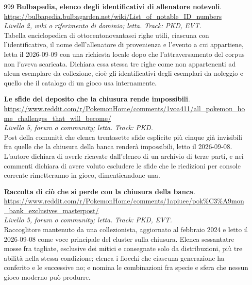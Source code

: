\begin{thebibliography}{999}
  \textbf{Bulbapedia, elenco degli identificativi di allenatore notevoli}.
  \\ \url{https://bulbapedia.bulbagarden.net/wiki/List_of_notable_ID_numbers}
  \\ \emph{Livello 2, wiki o riferimento di dominio; letta. Track: PKD, EVT.}
  \\ Tabella enciclopedica di ottocentonovantasei righe utili, ciascuna con l'identificativo, il nome dell'allenatore di provenienza e l'evento a cui appartiene, letta il 2026-09-09 con una richiesta locale dopo che l'attraversamento del corpus non l'aveva scaricata. Dichiara essa stessa tre righe come non appartenenti ad alcun esemplare da collezione, cioè gli identificativi degli esemplari da noleggio e quello che il catalogo di un gioco usa internamente.

  \textbf{Le sfide del deposito che la chiusura rende impossibili}.
  \\ \url{https://www.reddit.com/r/PokemonHome/comments/1voa411/all_pokemon_home_challenges_that_will_become/}
  \\ \emph{Livello 5, forum o community; letta. Track: PKD.}
  \\ Post della comunità che elenca trentasette sfide esplicite più cinque già invisibili fra quelle che la chiusura della banca renderà impossibili, letto il 2026-09-08. L'autore dichiara di averle ricavate dall'elenco di un archivio di terze parti, e nei commenti dichiara di avere voluto escludere le sfide che le riedizioni per console corrente rimetteranno in gioco, dimenticandone una.

  \textbf{Raccolta di ciò che si perde con la chiusura della banca}.
  \\ \url{https://www.reddit.com/r/PokemonHome/comments/1apiuee/pok\%C3\%A9mon_bank_exclusives_masterpost/}
  \\ \emph{Livello 5, forum o community; letta. Track: PKD, EVT.}
  \\ Raccoglitore mantenuto da una collezionista, aggiornato al febbraio 2024 e letto il 2026-09-08 come voce principale del cluster sulla chiusura. Elenca sessantatre mosse fra tagliate, esclusive dei mitici e consegnate solo da distribuzioni, più tre abilità nella stessa condizione; elenca i fiocchi che ciascuna generazione ha conferito e le successive no; e nomina le combinazioni fra specie e sfera che nessun gioco moderno può produrre.


\end{thebibliography}

